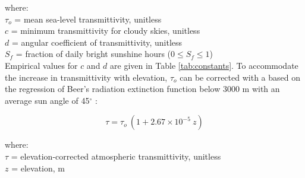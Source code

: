 \noindent where: \\
\indent $\tau_o$ = mean sea-level transmittivity, unitless \\
\indent $c$ = minimum transmittivity for cloudy skies, unitless \\
\indent $d$ = angular coefficient of transmittivity, unitless \\
\indent $S_f$ = fraction of daily bright sunshine hours ($0\leq S_f\leq 1$) \\

\noindent Empirical values for $c$ and $d$ are given in Table \ref{tab:constants}. 
To accommodate the increase in transmittivity with elevation, $\tau_o$ can be corrected with a based on the regression of Beer's radiation extinction function below 3000 m with an average sun angle of 45$^{\circ}$ \parencite{allen96}:

\begin{equation}
\label{eq:tau}
	\tau = \tau_o\:\left( 1+2.67\times 10^{-5}\: z \right)
\end{equation}

\noindent where: \\
\indent $\tau$ = elevation-corrected atmospheric transmittivity, unitless \\
\indent $z$ = elevation, m \\

